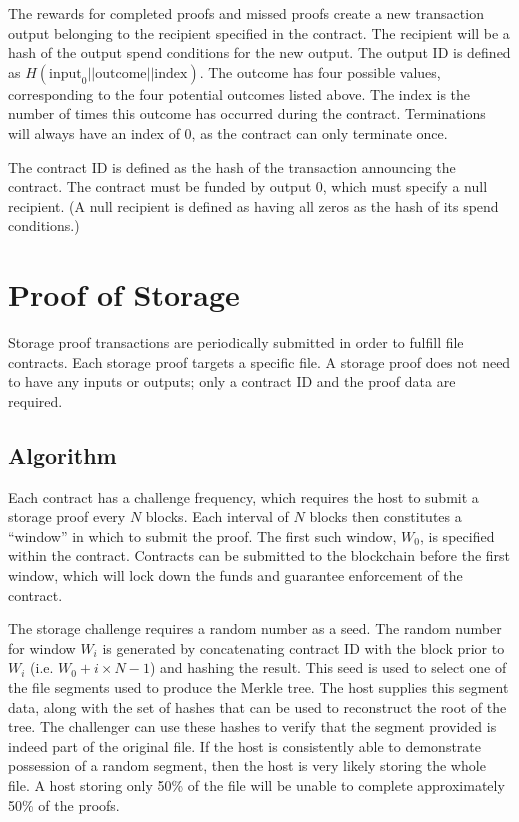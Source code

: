 \documentclass[twocolumn]{article}
\begin{document}
The rewards for completed proofs and missed proofs create a new transaction output belonging to the recipient specified in the contract.
The recipient will be a hash of the output spend conditions for the new output.
The output ID is defined as $H(\text{input}_0 || \text{outcome} || \text{index})$.
The outcome has four possible values, corresponding to the four potential outcomes listed above.
The index is the number of times this outcome has occurred during the contract.
Terminations will always have an index of 0, as the contract can only terminate once.

The contract ID is defined as the hash of the transaction announcing the contract.
The contract must be funded by output 0, which must specify a null recipient.
(A null recipient is defined as having all zeros as the hash of its spend conditions.)

\section{Proof of Storage}
\label{sec:storage}
Storage proof transactions are periodically submitted in order to fulfill file contracts.
Each storage proof targets a specific file.
A storage proof does not need to have any inputs or outputs; only a contract ID and the proof data are required.

\subsection{Algorithm}
Each contract has a challenge frequency, which requires the host to submit a storage proof every $N$ blocks.
Each interval of $N$ blocks then constitutes a ``window'' in which to submit the proof.
The first such window, $W_0$, is specified within the contract.
Contracts can be submitted to the blockchain before the first window, which will lock down the funds and guarantee enforcement of the contract.

The storage challenge requires a random number as a seed.
The random number for window $W_i$ is generated by concatenating contract ID with the block prior to $W_i$ (i.e. $W_0 + i \times N - 1$) and hashing the result.
This seed is used to select one of the file segments used to produce the Merkle tree.
The host supplies this segment data, along with the set of hashes that can be used to reconstruct the root of the tree.
The challenger can use these hashes to verify that the segment provided is indeed part of the original file.
If the host is consistently able to demonstrate possession of a random segment, then the host is very likely storing the whole file.
A host storing only 50\% of the file will be unable to complete approximately 50\% of the proofs.
\end{document}
